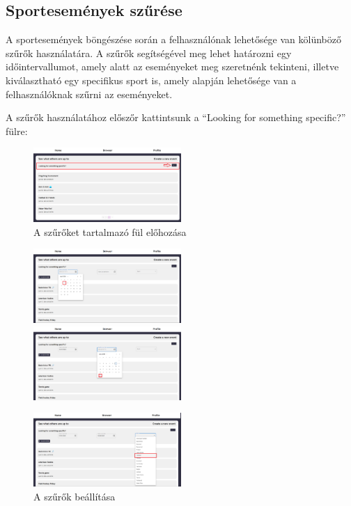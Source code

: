 \subsection{Sportesemények szűrése}

A sportesemények böngészése során a felhasználónak lehetősége van kölünböző szűrők használatára.
A szűrők segítségével meg lehet határozni egy időintervallumot, amely alatt az eseményeket meg szeretnénk tekinteni, illetve kiválasztható egy
specifikus sport is, amely alapján lehetősége van a felhasználóknak szűrni az eseményeket.

A szűrők használatához előszőr kattintsunk a ``Looking for something specific?'' fülre:

\begin{figure}[h]
	\centering
	\includegraphics[width=0.5\textwidth]{images/filtering_events_1.png}
	\caption{A szűrőket tartalmazó fül előhozása}
	\label{fig:filter_1}
\end{figure}

\newpage

\begin{figure}[ht]
	\includegraphics[width=0.5\textwidth]{images/filtering_events_2.png}
	\includegraphics[width=0.5\textwidth]{images/filtering_events_3.png}
	\begin{center}
		\includegraphics[width=0.5\textwidth]{images/filtering_events_4.png}
	\end{center}
	\caption{A szűrők beállítása}	
	\label{fig:applying_filters}
\end{figure}

